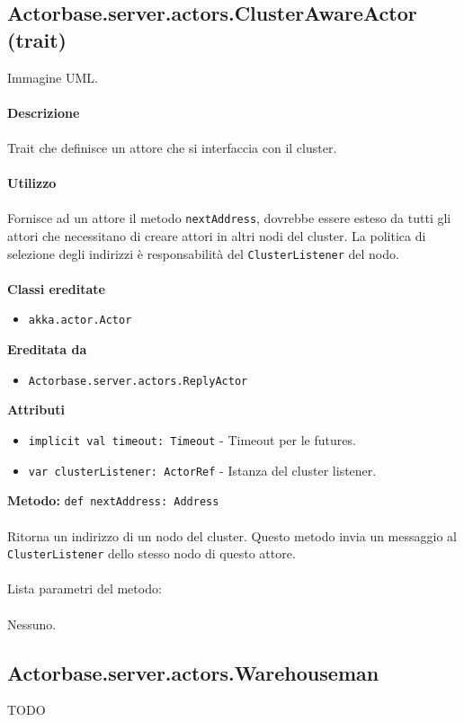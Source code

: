 \documentclass[a4paper]{article}
\begin{document}
	\subsection{Actorbase.server.actors.ClusterAwareActor (trait)}
		Immagine UML.
		\\ \\
		\textbf{Descrizione}
			\\ \\
			Trait che definisce un attore che si interfaccia con il cluster.
			\\ \\
		\textbf{Utilizzo}
			\\ \\
			Fornisce ad un attore il metodo \texttt{nextAddress}, dovrebbe essere esteso da tutti gli attori che necessitano di creare attori in altri nodi del cluster. La politica di selezione degli indirizzi è responsabilità del \texttt{ClusterListener} del nodo.
			\\ \\
		\textbf{Classi ereditate}
			\begin{itemize}
				\item \texttt{akka.actor.Actor}
			\end{itemize}
		\textbf{Ereditata da}
			\begin{itemize}
				\item \texttt{Actorbase.server.actors.ReplyActor}
			\end{itemize}
		\textbf{Attributi}
			\begin{itemize}
				\item \texttt{implicit val timeout: Timeout} - Timeout per le futures. 
				\item \texttt{var clusterListener: ActorRef} - Istanza del cluster listener. 
			\end{itemize}
		\textbf{Metodo: }\texttt{def nextAddress: Address}
			\\ \\
			Ritorna un indirizzo di un nodo del cluster. Questo metodo invia un messaggio al \texttt{ClusterListener} dello stesso nodo di questo attore.
			\\ \\
			Lista parametri del metodo:
			\\ \\
			Nessuno.
		
			
	\subsection{Actorbase.server.actors.Warehouseman}
		TODO
			
\end{document}
